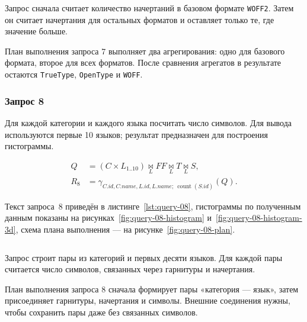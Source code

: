 Запрос сначала считает количество начертаний в базовом формате \texttt{WOFF2}. Затем он считает начертания для остальных форматов и оставляет только те, где значение больше.


План выполнения запроса 7 выполняет два агрегирования: одно для базового формата, второе для всех форматов. После сравнения агрегатов в результате остаются \texttt{TrueType}, \texttt{OpenType} и \texttt{WOFF}.


\subsubsection{Запрос 8}

Для каждой категории и каждого языка посчитать число символов. Для вывода используются первые 10 языков; результат предназначен для построения гистограммы.

\[
\begin{aligned}
Q &= (C \times L_{1..10}) \underset{L}{\bowtie} FF
\underset{L}{\bowtie} T \underset{L}{\bowtie} S,\\
R_8 &= \gamma_{C.id,C.name,L.id,L.name;\ \operatorname{count}(S.id)}(Q).
\end{aligned}
\]

Текст запроса~8 приведён в листинге~\ref{lst:query-08}, гистограммы по полученным данным показаны на рисунках~\ref{fig:query-08-histogram} и~\ref{fig:query-08-histogram-3d}, схема плана выполнения --- на рисунке~\ref{fig:query-08-plan}.

\label{lst:query-08}
\vspace{-10pt}
\inputminted[linenos, numbersep=10pt, firstnumber=1, fontsize=\small]{sql}{../src/queries/query_08.sql}

Запрос строит пары из категорий и первых десяти языков. Для каждой пары считается число символов, связанных через гарнитуры и начертания.


План выполнения запроса 8 сначала формирует пары «категория --- язык», затем присоединяет гарнитуры, начертания и символы. Внешние соединения нужны, чтобы сохранить пары даже без связанных символов.

